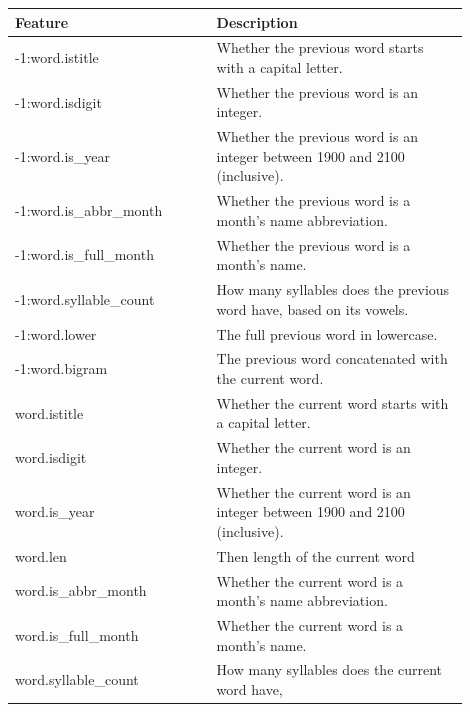 \documentclass[a4paper, conference]{ieeeconf}
\begin{document}
  \begin{table}[ht!]
    \centering
    \begin{tabular}{|p{0.4\linewidth}|p{0.5\linewidth}|}
      \hline
      \textbf{Feature} & \textbf{Description} \\
      \hline
      \rowcolor{dark_blue}
      -1:word.istitle & Whether the previous word starts with a capital letter.
      \\
      \hline
      \rowcolor{dark_blue}
      -1:word.isdigit & Whether the previous word is an integer. \\
      \hline
      \rowcolor{dark_blue}
      -1:word.is\_year & Whether the previous word is an integer between 1900
      and 2100 (inclusive). \\
      \hline
      \rowcolor{dark_blue}
      -1:word.is\_abbr\_month & Whether the previous word is a month's name
      abbreviation. \\
      \hline
      \rowcolor{dark_blue}
      -1:word.is\_full\_month & Whether the previous word is a month's name. \\
      \hline
      \rowcolor{dark_blue}
      -1:word.syllable\_count & How many syllables does the previous word have,
      based on its vowels. \\
      \hline
      \rowcolor{dark_blue}
      -1:word.lower & The full previous word in lowercase. \\
      \hline
      \rowcolor{dark_blue}
      -1:word.bigram & The previous word concatenated with the current word. \\
      \hline
      \rowcolor{blue}
      word.istitle & Whether the current word starts with a capital letter. \\
      \hline
      \rowcolor{blue}
      word.isdigit & Whether the current word is an integer.\\
      \hline
      \rowcolor{blue}
      word.is\_year & Whether the current word is an integer between 1900
      and 2100 (inclusive). \\
      \hline
      \rowcolor{blue}
      word.len & Then length of the current word \\
      \hline
      \rowcolor{blue}
      word.is\_abbr\_month & Whether the current word is a month's name
      abbreviation. \\
      \hline
      \rowcolor{blue}
      word.is\_full\_month & Whether the current word is a month's name. \\
      \hline
      \rowcolor{blue}
      word.syllable\_count & How many syllables does the current word have,

\end{tabular}
\end{table}
\end{document}
